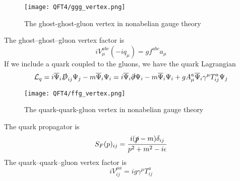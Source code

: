 \documentclass[cyan]{elegantnote}
\begin{document}
\begin{figure}[!h]
	\centering
	\texttt{[image: QFT4/ggg\_vertex.png]}
	\caption{The ghost-ghost-gluon vertex in nonabelian gauge theory}
\end{figure}

\noindent
The ghost–ghost–gluon vertex factor is
\[iV^{abc}_{\mu}(-iq_{\mu}) = gf^{abc}a_{\mu}\]
If we include a quark coupled to the gluons, we have the quark Lagrangian
\[\mathcal{L}_{q} = i\overline{\Psi}_{i}\slashed{D}_{ij}\Psi_{j} - m\overline{\Psi}_{i}\Psi_{i} = i\overline{\Psi}_{i}\slashed{\partial}\Psi_{i} - m\overline{\Psi}_{i}\Psi_{i} + gA^a_{\mu}\overline{\Psi}_{i} \gamma^{\mu} T^a_{ij} \Psi_j \]

\begin{figure}[!h]
	\centering
	\texttt{[image: QFT4/ffg\_vertex.png]}
	\caption{The quark-quark-gluon vertex in nonabelian gauge theory}
\end{figure}

\noindent
The quark propagator is
\[S_F(p)_{ij} = \frac{i(\slashed{p}-m)\delta_{ij}}{p^2+m^2 - i\epsilon}\]
The quark–quark–gluon vertex factor is
\[iV^{\mu a}_{ij} =  ig\gamma^{\mu}T^a_{ij}\]
\end{document}

